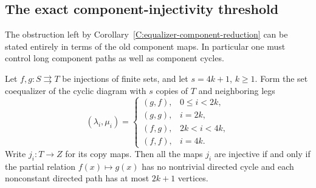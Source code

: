 \subsection{The exact component-injectivity threshold}

The obstruction left by
Corollary~\ref{C:equalizer-component-reduction} can be stated
entirely in terms of the old component maps. In particular one
must control long component paths as well as component cycles.

\begin{proposition}
\label{C:set-necklace-injectivity}
Let $f,g:S\rightrightarrows T$ be injections of finite sets, and
let $s=4k+1$, $k\geq1$. Form the set coequalizer of the cyclic
diagram with $s$ copies of $T$ and neighboring legs
\[
 (\lambda_i,\mu_i)=
 \begin{cases}
 (g,f),&0\leq i<2k,\\
 (g,g),&i=2k,\\
 (f,g),&2k<i<4k,\\
 (f,f),&i=4k.
 \end{cases}
\]
Write $j_i:T\to Z$ for its copy maps. Then all the maps $j_i$
are injective if and only if the partial relation
$f(x)\mapsto g(x)$ has no nontrivial directed cycle and each
nonconstant directed path has at most $2k+1$ vertices.
\end{proposition}

